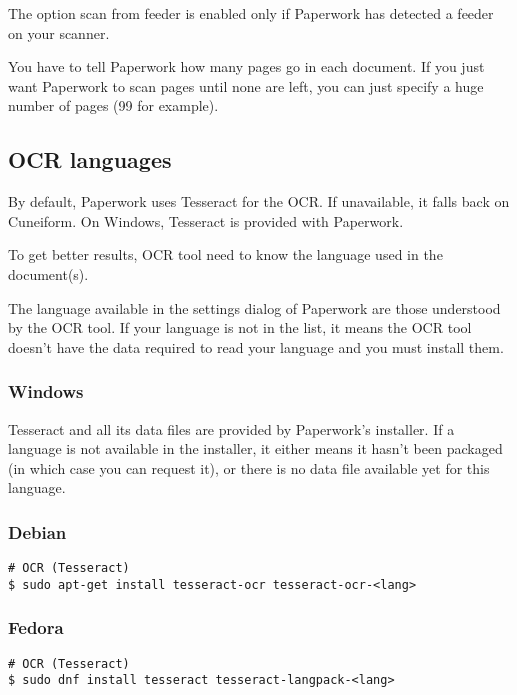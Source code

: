 \documentclass[10pt,a4paper]{article}
\begin{document}
The option scan from feeder is enabled
only if Paperwork has detected a feeder on your scanner.

You have to tell Paperwork how many pages go in each document. If
you just want Paperwork to scan pages until none are left, you can
just specify a huge number of pages (99 for example).



\subsection{OCR languages}

By default, Paperwork uses Tesseract for the OCR. If unavailable,
it falls back on Cuneiform. On Windows, Tesseract is provided with
Paperwork.

To get better results, OCR tool need to know the language used in
the document(s).

The language available in the settings dialog of Paperwork are those
understood by the OCR tool. If your language is not in the list, it
means the OCR tool doesn't have the data required to read your language
and you must install them.

\subsubsection{Windows}

Tesseract and all its data files are provided by Paperwork's installer.
If a language is not available in the installer, it either means it
hasn't been packaged (in which case you can request it), or there
is no data file available yet for this language.

\subsubsection{Debian}
\begin{verbatim}
# OCR (Tesseract)
$ sudo apt-get install tesseract-ocr tesseract-ocr-<lang>
\end{verbatim}

\subsubsection{Fedora}
\begin{verbatim}
# OCR (Tesseract)
$ sudo dnf install tesseract tesseract-langpack-<lang>
\end{verbatim}
\end{document}
